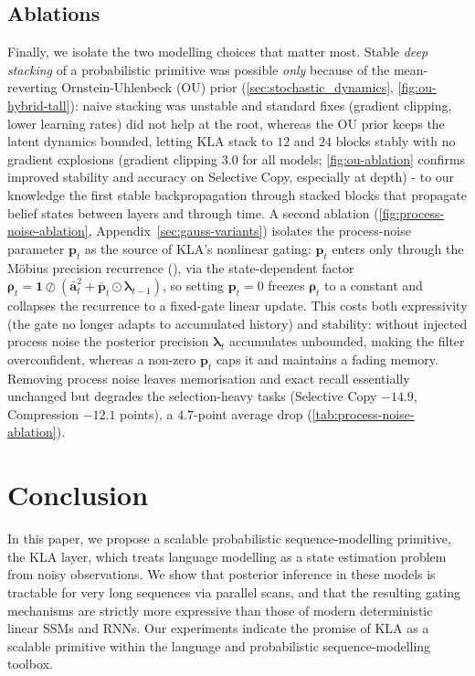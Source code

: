 \documentclass{article}
\newcommand{\our}{\textsc{KLA}\xspace}
\begin{document}
\subsection{Ablations}
\label{sec:ablations}
Finally, we isolate the two modelling choices that matter most. Stable \emph{deep stacking} of a probabilistic primitive was possible \emph{only} because of the mean-reverting Ornstein-Uhlenbeck (OU) prior (\cref{sec:stochastic_dynamics}, \cref{fig:ou-hybrid-tall}): naive stacking was unstable and standard fixes (gradient clipping, lower learning rates) did not help at the root, whereas the OU prior keeps the latent dynamics bounded, letting \textsc{KLA} stack to $12$ and $24$ blocks stably with no gradient explosions (gradient clipping $3.0$ for all models; \cref{fig:ou-ablation} confirms improved stability and accuracy on Selective Copy, especially at depth) - to our knowledge the first stable backpropagation through stacked blocks that propagate belief states between layers and through time. A second ablation (\cref{fig:process-noise-ablation}, Appendix~\ref{sec:gauss-variants}) isolates the process-noise parameter $\mathbf{p}_t$ as the source of \textsc{KLA}'s nonlinear gating: $\mathbf{p}_t$ enters only through the M\"{o}bius precision recurrence (), via the state-dependent factor $\boldsymbol{\rho}_t = \mathbf{1}\oslash(\bar{\mathbf{a}}_t^2 + \bar{\mathbf{p}}_t\odot\boldsymbol{\lambda}_{t-1})$, so setting $\mathbf{p}_t{=}0$ freezes $\boldsymbol{\rho}_t$ to a constant and collapses the recurrence to a fixed-gate linear update. This costs both expressivity (the gate no longer adapts to accumulated history) and stability: without injected process noise the posterior precision $\boldsymbol{\lambda}_t$ accumulates unbounded, making the filter overconfident, whereas a non-zero $\mathbf{p}_t$ caps it and maintains a fading memory. Removing process noise leaves memorisation and exact recall essentially unchanged but degrades the selection-heavy tasks (Selective Copy $-14.9$, Compression $-12.1$ points), a $4.7$-point average drop (\cref{tab:process-noise-ablation}).


\section{Conclusion}
In this paper, we propose a scalable probabilistic sequence-modelling primitive, the \our layer, which treats language modelling as a state estimation problem from noisy observations. We show that posterior inference in these models is tractable for very long sequences via parallel scans, and that the resulting gating mechanisms are strictly more expressive than those of modern deterministic linear SSMs and RNNs. Our experiments indicate the promise of \our as a scalable primitive within the language and probabilistic sequence-modelling toolbox.
\end{document}
